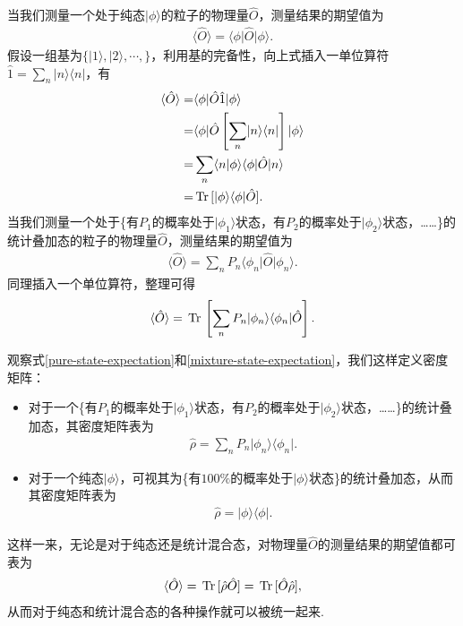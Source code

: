 \documentclass{assignment}
\begin{document}
当我们测量一个处于纯态$\lvert\phi\rangle$的粒子的物理量$\hat{O}$，测量结果的期望值为
\begin{align}
    \langle\hat{O}\rangle=\langle\phi\rvert\hat{O}\lvert\phi\rangle.
\end{align}
假设一组基为$\{\lvert 1\rangle,\lvert 2\rangle,\cdots,\}$，利用基的完备性，向上式插入一单位算符$\hat{1}=\sum_n\lvert n\rangle\langle n\rvert$，有
\begin{align}
    \label{mixture-state-expectation}
    \notag\langle\hat{O}\rangle=&\langle\phi\rvert\hat{O}\hat{1}\lvert\phi\rangle\\
    \notag=&\langle\phi\rvert\hat{O}\left[\sum_n\lvert n\rangle\langle n\rvert\right]\lvert\phi\rangle\\
    \notag=&\sum_n\langle n\vert\phi\rangle\langle\phi\rvert\hat{O}\lvert n\rangle\\
    =&\,\text{Tr}\,[\lvert\phi\rangle\langle\phi\rvert\hat{O}].
\end{align}
当我们测量一个处于\{有$P_1$的概率处于$\lvert\phi_1\rangle$状态，有$P_2$的概率处于$\lvert\phi_2\rangle$状态，……\}的统计叠加态的粒子的物理量$\hat{O}$，测量结果的期望值为
\begin{align}
    \langle\hat{O}\rangle=\sum_nP_n\langle\phi_n\rvert\hat{O}\lvert\phi_n\rangle.
\end{align}
同理插入一个单位算符，整理可得
\begin{align}
    \label{pure-state-expectation}
    \langle\hat{O}\rangle=\,\text{Tr}\,\left[\sum_nP_n\lvert\phi_n\rangle\langle\phi_n\rvert\hat{O}\right].
\end{align}

观察式\eqref{pure-state-expectation}和\eqref{mixture-state-expectation}，我们这样定义密度矩阵：
\begin{itemize}
    \item 对于一个\{有$P_1$的概率处于$\lvert\phi_1\rangle$状态，有$P_2$的概率处于$\lvert\phi_2\rangle$状态，……\}的统计叠加态，其密度矩阵表为
    \begin{align}
        \hat{\rho}=\sum_nP_n\lvert\phi_n\rangle\langle\phi_n\rvert.
    \end{align}
    \item 对于一个纯态$\lvert\phi\rangle$，可视其为\{有$100\%$的概率处于$\lvert\phi\rangle$状态\}的统计叠加态，从而其密度矩阵表为
    \begin{align}
        \hat{\rho}=\lvert\phi\rangle\langle\phi\rvert.
    \end{align}
\end{itemize}
这样一来，无论是对于纯态还是统计混合态，对物理量$\hat{O}$的测量结果的期望值都可表为
\begin{align}
    \langle\hat{O}\rangle=\,\text{Tr}\,[\hat{\rho}\hat{O}]=\,\text{Tr}\,[\hat{O}\hat{\rho}],
\end{align}
从而对于纯态和统计混合态的各种操作就可以被统一起来.
\end{document}
